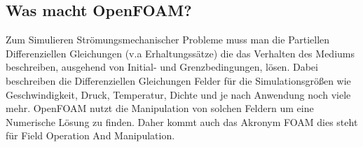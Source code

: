 \subsection{Was macht OpenFOAM?}
Zum Simulieren Strömungsmechanischer Probleme muss man die Partiellen Differenziellen Gleichungen (v.a Erhaltungssätze) die das Verhalten des Mediums beschreiben, ausgehend von Initial- und Grenzbedingungen, lösen.
Dabei beschreiben die Differenziellen Gleichungen Felder für die Simulationsgrößen wie Geschwindigkeit, Druck, Temperatur, Dichte und je nach Anwendung noch viele mehr. OpenFOAM nutzt die Manipulation von solchen Feldern um eine Numerische Lösung zu finden. Daher kommt auch das Akronym FOAM dies steht für Field Operation And  Manipulation.

